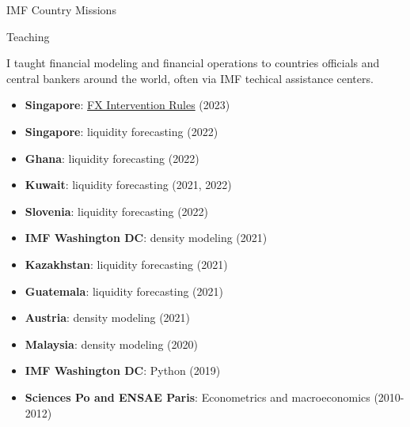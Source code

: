 \documentclass[usegeometry, 10pt, a4paper]{cv} %
\begin{document}
\begin{rubriquetableau}[0.95\textwidth]{IMF Country Missions}
\begin{multicols}{2}
\end{multicols}  
\end{rubriquetableau}


\vspace{0.5cm}

\begin{rubriquetableau}[0.95\textwidth]{Teaching}

  I taught financial modeling and financial operations to countries officials and central bankers around the world, often via IMF techical assistance centers. 
  
  \begin{multicols}{2}
  
  \begin{itemize}
  \item \textbf{Singapore}: \href{https://romainlafarguette.github.io/fxinterventions/docs/index.html}{FX Intervention Rules} (2023)    
  \item \textbf{Singapore}: liquidity forecasting (2022)
  \item \textbf{Ghana}: liquidity forecasting (2022)
  \item \textbf{Kuwait}: liquidity forecasting (2021, 2022)
  \item \textbf{Slovenia}: liquidity forecasting (2022)
  \item \textbf{IMF Washington DC}: density modeling (2021)
  \item \textbf{Kazakhstan}: liquidity forecasting (2021)
  \item \textbf{Guatemala}: liquidity forecasting (2021)
  \item \textbf{Austria}: density modeling (2021)
  \item \textbf{Malaysia}: density modeling (2020)
  \item \textbf{IMF Washington DC}: Python (2019)
  \item \textbf{Sciences Po and ENSAE Paris}: Econometrics and macroeconomics (2010-2012)
  \end{itemize}
  
  \end{multicols}
\end{rubriquetableau}




\end{document}
